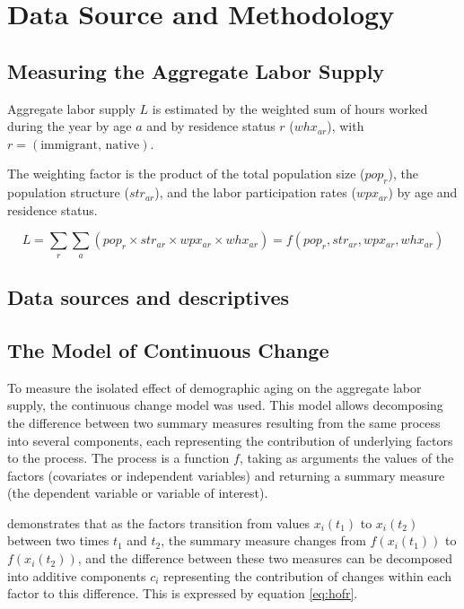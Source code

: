 \section{Data Source and Methodology}\label{sec:lab_method}

  \subsection{Measuring the Aggregate Labor Supply}
  Aggregate labor supply \(L\) is estimated by the weighted sum of hours worked during the year by age \(a\) and by residence status \(r\) (\(whx_{ar}\)), with \(r = (\text{immigrant, native})\). 

  The weighting factor is the product of the total population size (\(pop_{r}\)), the population structure (\(str_{ar}\)), and the labor participation rates (\(wpx_{ar}\)) by age and residence status.

  \begin{equation}\label{eq:pclab}
    L = \displaystyle\sum_{r}\displaystyle\sum_{a}(pop_{r} \times str_{ar} \times wpx_{ar} \times whx_{ar}) = f(pop_{r}, str_{ar}, wpx_{ar}, whx_{ar})
  \end{equation}


  \subsection{Data sources and descriptives}


  \subsection{The Model of Continuous Change}
  
  To measure the isolated effect of demographic aging on the aggregate labor supply, the continuous change model \citep{horiuchiDecompositionMethodBased2008} was used. This model allows decomposing the difference between two summary measures resulting from the same process into several components, each representing the contribution of underlying factors to the process. The process is a function \(f\), taking as arguments the values of the factors (covariates or independent variables) and returning a summary measure (the dependent variable or variable of interest).
  
  \vspace{0.7em}\par
  \citet{horiuchiDecompositionMethodBased2008} demonstrates that as the factors transition from values \(x_i(t_1)\) to \(x_i(t_2)\) between two times \(t_1\) and \(t_2\), the summary measure changes from \(f(x_i(t_1))\) to \(f(x_i(t_2))\), and the difference between these two measures can be decomposed into additive components \(c_{i}\) representing the contribution of changes within each factor to this difference. This is expressed by equation \eqref{eq:hofr}.
  
